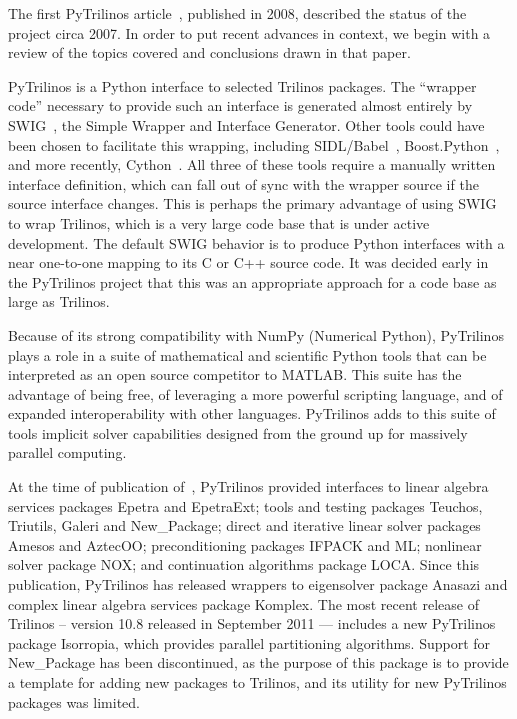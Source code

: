 \documentclass[11pt]{article}
\begin{document}
The first PyTrilinos article~\cite{PyTrilinos}, published in 2008, described the status of the project circa 2007.  In order to put recent advances in context, we begin with a review of the topics covered and conclusions drawn in that paper.

PyTrilinos is a Python interface to selected Trilinos packages.  The ``wrapper code'' necessary to provide such an interface is generated almost entirely by SWIG~\cite{SWIG_CXX_Python}, the Simple Wrapper and Interface Generator.  Other tools could have been chosen to facilitate this wrapping, including SIDL/Babel~\cite{Babel}, Boost.Python~\cite{BoostPython}, and more recently, Cython~\cite{Cython}.  All three of these tools require a manually written interface definition, which can fall out of sync with the wrapper source if the source interface changes.  This is perhaps the primary advantage of using SWIG to wrap Trilinos, which is a very large code base that is under active development.  The default SWIG behavior is to produce Python interfaces with a near one-to-one mapping to its C or C++ source code.  It was decided early in the PyTrilinos project that this was an appropriate approach for a code base as large as Trilinos.

Because of its strong compatibility with NumPy (Numerical Python), PyTrilinos plays a role in a suite of mathematical and scientific Python tools that can be interpreted as an open source competitor to MATLAB.  This suite has the advantage of being free, of leveraging a more powerful scripting language, and of expanded interoperability with other languages.  PyTrilinos adds to this suite of tools implicit solver capabilities designed from the ground up for massively parallel computing.

At the time of publication of~\cite{PyTrilinos}, PyTrilinos provided interfaces to linear algebra services packages Epetra and EpetraExt; tools and testing packages Teuchos, Triutils, Galeri and New\_Package; direct and iterative linear solver packages Amesos and AztecOO; preconditioning packages IFPACK and ML; nonlinear solver package NOX; and continuation algorithms package LOCA.  Since this publication, PyTrilinos has released wrappers to eigensolver package Anasazi and complex linear algebra services package Komplex.  The most recent release of Trilinos -- version 10.8 released in September 2011 --- includes a new PyTrilinos package Isorropia, which provides parallel partitioning algorithms.  Support for New\_Package has been discontinued, as the purpose of this package is to provide a template for adding new packages to Trilinos, and its utility for new PyTrilinos packages was limited.
\end{document}
